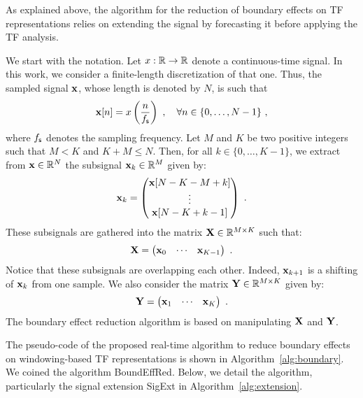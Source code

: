 As explained above, the algorithm for the reduction of boundary effects on TF representations relies on extending the signal by forecasting it before applying the TF analysis. 


We start with the notation. Let $x:{\mathbb R}\to{\mathbb R}$ denote a continuous-time signal. In this work, we consider a finite-length discretization of that one. Thus, the sampled signal ${\mathbf x}$, whose length is denoted by $N$, is such that
\[
\bx[n] = x\left(\frac{n}{\fs}\right)\ ,\quad \forall n\in\{0,\ldots,N-1\}\ , 
\]
where $f_{\mathsf s}$ denotes the sampling frequency. 
Let $M$ and $K$ be two positive integers such that $M<K$ and $K+M\leq N$. Then, for all $k\in\{0,\ldots,K-1\}$, we extract from ${\mathbf x}\in{\mathbb R}^N$ the subsignal ${\mathbf x}_k\in{\mathbb R}^M$ given by:
\begin{equation}
\bx_k = 
\begin{pmatrix}
\bx[N-K-M+k] \\
\vdots \\
\bx[N-K+k-1]
\end{pmatrix}\ .
\label{eq:xk}
\end{equation} 
These subsignals are gathered into the matrix ${\mathbf X}\in{\mathbb R}^{M\times K}$ such that:
\begin{equation*}
{\mathbf X} = 
\begin{pmatrix}
{\mathbf x}_0 & \cdots & {\mathbf x}_{K-1}
\end{pmatrix}\ .
\end{equation*}
Notice that these subsignals are overlapping each other. Indeed, ${\mathbf x}_{k+1}$ is a shifting of ${\mathbf x}_k$ from one sample. We also consider the matrix ${\mathbf Y}\in{\mathbb R}^{M\times K}$ given by:
\begin{equation*}
{\mathbf Y} = 
\begin{pmatrix}
{\mathbf x}_1 & \cdots & {\mathbf x}_{K}
\end{pmatrix}\ .
\end{equation*}
The boundary effect reduction algorithm is based on manipulating ${\mathbf X}$ and ${\mathbf Y}$.

%
The pseudo-code of the proposed real-time algorithm to reduce boundary effects on windowing-based TF representations is shown in Algorithm~\ref{alg:boundary}. We coined the algorithm {\sf BoundEffRed}. Below, we detail the algorithm, particularly the signal extension {\sf SigExt} in Algorithm~\ref{alg:extension}.


